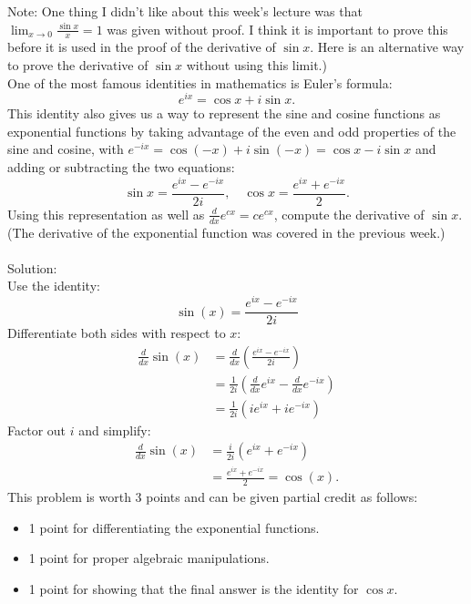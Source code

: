 \documentclass[12pt]{article}
\newenvironment{problem}[2][Problem]{\begin{trivlist}
\item[\hskip \labelsep {\bfseries #1}\hskip \labelsep {\bfseries #2.}]}
{\end{trivlist}}
\begin{document}
\begin{problem}{3} %
(Note: One thing I didn't like about this week's lecture was that\\
$\lim_{x \to 0} \frac{\sin x}{x} = 1$ was given without proof. I think it is 
important to prove this before it is used in the proof of the derivative of 
$\sin x$. Here is an alternative way to prove the derivative of $\sin x$ without
using this limit.)\\
One of the most famous identities in mathematics is Euler's formula:
\[
  e^{ix} = \cos x + i\sin x.
\]
This identity also gives us a way to represent the sine and cosine functions
as exponential functions by taking advantage of the even and odd properties of 
the sine and cosine, with $e^{-ix} = \cos(-x) + i\sin(-x) = \cos x - i\sin x$
and adding or subtracting the two equations:
\[
  \sin x = \frac{e^{ix} - e^{-ix}}{2i}, \quad
  \cos x = \frac{e^{ix} + e^{-ix}}{2}.
\]
Using this representation as well as $\frac{d}{dx}e^{cx} = ce^{cx}$, 
compute the derivative of $\sin x$.\\
(The derivative of the exponential function was covered in the previous week.)
\\\\
Solution:\\
Use the identity:
\[
  \sin(x) = \frac{e^{ix} - e^{-ix}}{2i}
\]
Differentiate both sides with respect to $x$:
\[
\begin{aligned}
  \frac{d}{dx}\sin(x) &= \frac{d}{dx}\left(\frac{e^{ix} - e^{-ix}}{2i}\right)\\
  &= \frac{1}{2i} \left( \frac{d}{dx} e^{ix} - \frac{d}{dx} e^{-ix} \right)\\
  &= \frac{1}{2i} \left( i e^{ix} + i e^{-ix} \right)
\end{aligned}
\]
Factor out $i$ and simplify:
\[
\begin{aligned}
  \frac{d}{dx}\sin(x) &= \frac{i}{2i} (e^{ix} + e^{-ix})\\
  &= \frac{e^{ix} + e^{-ix}}{2} = \cos(x).
\end{aligned}
\]
This problem is worth 3 points and can be given partial credit as follows:
\begin{itemize}
  \item 1 point for differentiating the exponential functions.
  \item 1 point for proper algebraic manipulations.
  \item 1 point for showing that the final answer is the identity for $\cos x$.
\end{itemize}
\end{problem}
\end{document}
